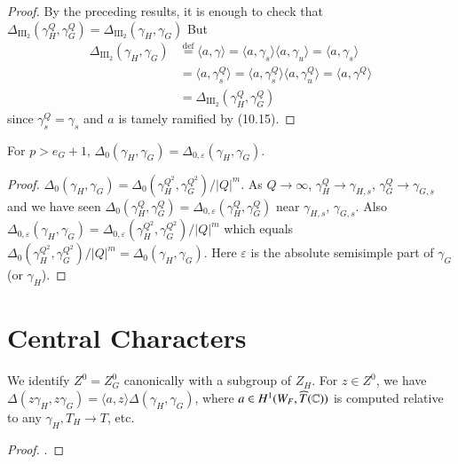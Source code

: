\documentclass{amsart}
\newenvironment{cthm}[1]
  {\renewcommand\thethm{\bf #1}\thm}
  {\endthm}
\def\Com{{\Bbb C}}                         %
\def\Def{\overset{\operatorname{def}}=}   %
\def\varep{\varepsilon}
\def\hgam{\gamma_H}
\def\ggam{\gamma_G}
\def\LANGLANDSO{21}
\begin{document}
\begin{proof} By the preceding results, it is enough
to check that 
$\Delta_{\text{III}_2}(\gamma_H^Q,\gamma_G^Q)
= \Delta_{\text{III}_2}(\gamma_H,\gamma_G)$
But
$$
\begin{array}{lll}
\Delta_{\text{III}_2}(\gamma_H,\gamma_G)
&\Def
\langle a,\gamma\rangle =\langle a,\gamma_s\rangle
\langle a,\gamma_u\rangle = \langle a,\gamma_s\rangle\\
&=\langle a,\gamma_s^Q\rangle =\langle a,\gamma_s^Q\rangle
\langle a,\gamma_u^Q\rangle = \langle a,\gamma^Q\rangle\\
&=\Delta_{\text{III}_2}(\gamma_H^Q,\gamma_G^Q)
\end{array}
$$
since $\gamma_s^Q=\gamma_s$ and $a$ is tamely ramified by (10.15).
\end{proof}

\begin{cthm}{Theorem 10.18}  For $p > e_G+1$, $\Delta_0(\gamma_H,
\gamma_G) = \Delta_{0,\varep}(	\gamma_H,\gamma_G)$.
\end{cthm}

\begin{proof} $\Delta_0(\gamma_H,\gamma_G) =
{\Delta_0(\gamma_H^{Q^2},\gamma_G^{Q^2})}/{|Q|^m}$.
As $Q\to\infty$, $\gamma_H^Q\to \gamma_{H,s}$,
$\gamma_G^Q\to \gamma_{G,s}$ and we have seen
$\Delta_0(\gamma_H^Q,\gamma_G^Q) =\Delta_{0,\varep}(\gamma_H^Q,\gamma_G^Q)$
near $\gamma_{H,s}$, $\gamma_{G,s}$.  Also
$\Delta_{0,\varep}(\gamma_H,\gamma_G)
={\Delta_{0,\varep}(\gamma_H^{Q^2},\gamma_G^{Q^2})}/{|Q|^m}$
which equals
${\Delta_0(\gamma_H^{Q^2},\gamma_G^{Q^2})}/{|Q|^m}
= \Delta_0(\gamma_H,\gamma_G)$.  Here $\varep$ is the absolute 
semisimple part of $\gamma_G$ (or $\gamma_H$).
\end{proof}




\section{Central Characters} %

We identify $Z^0 = Z^0_G$ canonically with a subgroup of
$Z_H$.
\begin{cthm}{Lemma 11.1} For $z\in Z^0$, we have $\Delta(z\hgam,z\ggam)
=\langle a,z\rangle\Delta(\hgam,\ggam)$,
 where $a\in H^1(W_F,\widehat T(\Com))$ is computed
relative to any $\hgam,T_H\to T$, etc.
\end{cthm}

\begin{proof}  \cite{\LANGLANDSO}.\end{proof}
\end{document}
